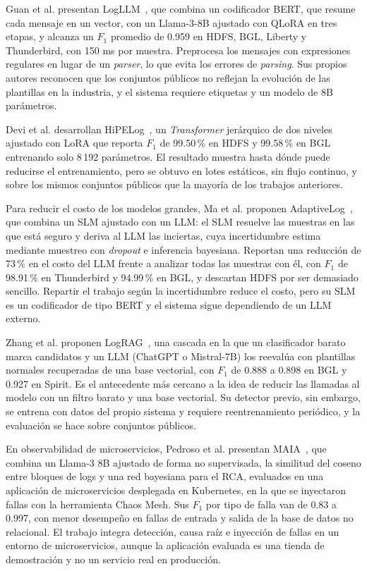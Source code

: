 Guan et al. presentan LogLLM~\cite{guan2024_logllm}, que combina un codificador BERT, que resume cada mensaje en un vector, con un Llama-3-8B ajustado con QLoRA en tres etapas, y alcanza un $F_1$ promedio de 0.959 en HDFS, BGL, Liberty y Thunderbird, con 150 ms por muestra. Preprocesa los mensajes con expresiones regulares en lugar de un \textit{parser}, lo que evita los errores de \textit{parsing}. Sus propios autores reconocen que los conjuntos públicos no reflejan la evolución de las plantillas en la industria, y el sistema requiere etiquetas y un modelo de 8B parámetros.

Devi et al. desarrollan HiPELog~\cite{devi2026_hipelog}, un \textit{Transformer} jerárquico de dos niveles ajustado con LoRA que reporta $F_1$ de 99.50\,\% en HDFS y 99.58\,\% en BGL entrenando solo 8\,192 parámetros. El resultado muestra hasta dónde puede reducirse el entrenamiento, pero se obtuvo en lotes estáticos, sin flujo continuo, y sobre los mismos conjuntos públicos que la mayoría de los trabajos anteriores.

Para reducir el costo de los modelos grandes, Ma et al. proponen AdaptiveLog~\cite{ma2026_adaptivelog}, que combina un SLM ajustado con un LLM: el SLM resuelve las muestras en las que está seguro y deriva al LLM las inciertas, cuya incertidumbre estima mediante muestreo con \textit{dropout} e inferencia bayesiana. Reportan una reducción de 73\,\% en el costo del LLM frente a analizar todas las muestras con él, con $F_1$ de 98.91\,\% en Thunderbird y 94.99\,\% en BGL, y descartan HDFS por ser demasiado sencillo. Repartir el trabajo según la incertidumbre reduce el costo, pero su SLM es un codificador de tipo BERT y el sistema sigue dependiendo de un LLM externo.

Zhang et al. proponen LogRAG~\cite{zhang2024_lograg}, una cascada en la que un clasificador barato marca candidatos y un LLM (ChatGPT o Mistral-7B) los reevalúa con plantillas normales recuperadas de una base vectorial, con $F_1$ de 0.888 a 0.898 en BGL y 0.927 en Spirit. Es el antecedente más cercano a la idea de reducir las llamadas al modelo con un filtro barato y una base vectorial. Su detector previo, sin embargo, se entrena con datos del propio sistema y requiere reentrenamiento periódico, y la evaluación se hace sobre conjuntos públicos.

En observabilidad de microservicios, Pedroso et al. presentan MAIA~\cite{pedroso2025_maia}, que combina un Llama-3 8B ajustado de forma no supervisada, la similitud del coseno entre bloques de logs y una red bayesiana para el RCA, evaluados en una aplicación de microservicios desplegada en Kubernetes, en la que se inyectaron fallas con la herramienta Chaos Mesh. Sus $F_1$ por tipo de falla van de 0.83 a 0.997, con menor desempeño en fallas de entrada y salida de la base de datos no relacional. El trabajo integra detección, causa raíz e inyección de fallas en un entorno de microservicios, aunque la aplicación evaluada es una tienda de demostración y no un servicio real en producción.

